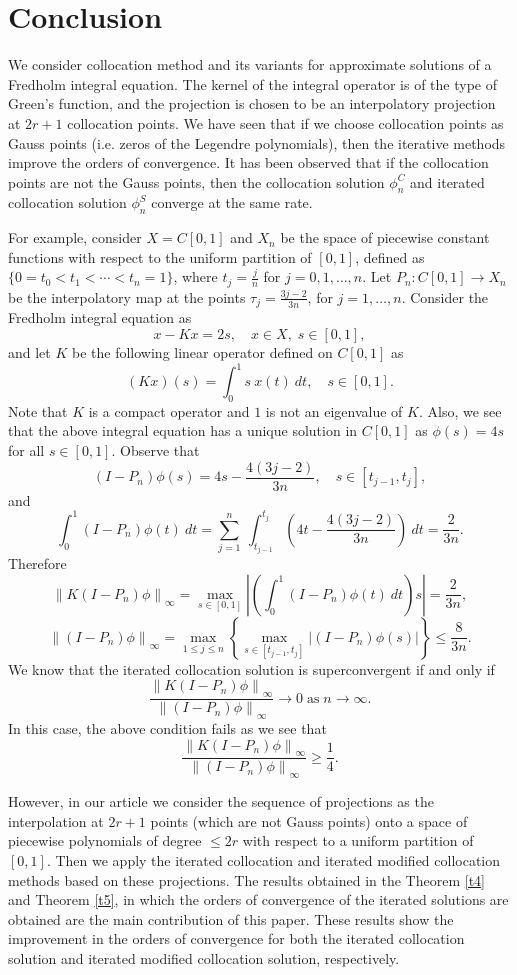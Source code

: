 \documentclass[sn-mathphys-num]{sn-jnl}%
\theoremstyle{thmstyleone}%
\theoremstyle{thmstyletwo}%
\theoremstyle{thmstylethree}%
\newcommand{\norm}[1]{\left\lVert #1\right\rVert}
\begin{document}
\section{Conclusion}
We consider collocation method and its variants for approximate solutions of a Fredholm integral equation. The kernel of the integral operator is of the type of Green's function, and the projection is chosen to be an interpolatory projection at $2r+1$ collocation points. We have seen that if we choose collocation points as Gauss points (i.e. zeros of the Legendre polynomials), then the iterative methods improve the orders of convergence. It has been observed that if the collocation points are not the Gauss points, then the collocation solution $\phi_n^C$ and iterated collocation solution $\phi_n^S$ converge at the same rate. 

For example, consider $X = C [0, 1]$ and $X_n$ be the space of piecewise constant functions with respect to the uniform partition of $[0,1]$, defined as $\{0 = t_0 < t_1 < \cdots < t_n = 1\}$, where $t_j = \frac{j}{n}$ for $j = 0,1, \ldots, n$. Let $P_n : C[0, 1] \to X_n$ be the interpolatory map at the points $ \tau_j = \frac{3j-2}{3n}$,  for $j = 1, \ldots, n$. Consider the Fredholm integral equation as
$$ 
x - Kx = 2s, \quad x \in X, \; s \in [0,1],
$$ 
and let  $K$ be the following linear operator defined on $C[0, 1]$ as
$$
(Kx)(s) =  \int_0^1 s \: x(t) \: dt  , \quad s \in [0, 1].
$$
Note that $K$ is a compact operator and $1$ is not an eigenvalue of $K$. Also, we see that the above integral equation has a unique solution in $C[0, 1]$ as  $\phi(s) = 4s$ for all $s \in [0, 1]$.  
Observe that
$$
(I - P_n) \phi(s)= 4s - \frac{4(3j-2)}{3n}, \quad s \in  [t_{j-1}, t_{j} ],
$$
and 
$$ 
\int_0^1 (I -P_n) \phi(t) ~dt =\sum_{j=1}^{n} ~ \int_{t_{j-1}}^{t_j} \left(4t -\frac{4(3j-2)}{3n} \right) ~ dt = \frac{2}{3n}.
$$
Therefore
$$
\norm{K(I -P_n) \phi }_\infty  =  \max_{s\in [0,1]} \left| \left( \int_0^1 (I -P_n) \phi(t) ~dt \right) s \right|  = \frac{2}{3n},
$$
$$ 
\norm{(I - P_n ) \phi}_\infty = \max_{1 \le j \le n} \left\{ \max_{s \in  [t_{j-1}, t_{j} ]} |(I - P_n ) \phi(s) | \right\} \le \frac{8}{3n}.
$$
We know that the iterated collocation solution is superconvergent if and only if
$$
\frac{\norm{K(I -P_n) \phi }_\infty }{ \norm{(I - P_n ) \phi}_\infty} \to 0 \; \text{as} \; n \to \infty.
$$
In this case, the above condition fails as we see that
$$
\frac{\norm{K(I -P_n) \phi }_\infty }{ \norm{(I - P_n ) \phi}_\infty} \ge \frac{1}{4}.
$$

However, in our article we consider the sequence of projections as the interpolation at $2r + 1$ points (which are not Gauss points) onto a space of piecewise polynomials of degree $\leq 2r$ with respect to a uniform partition of $[0, 1]$. Then we apply the iterated collocation and iterated modified collocation methods based on these projections. The results obtained in the Theorem \ref{t4} and Theorem \ref{t5}, in which the orders of convergence of the iterated solutions are obtained are the main contribution of this paper. These results show the improvement in the orders of convergence for both the iterated collocation solution and iterated modified collocation solution, respectively.
\end{document}
